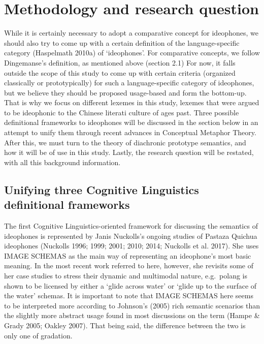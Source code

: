 \section{Methodology and research
question}\label{methodology-and-research-question}

While it is certainly necessary to adopt a comparative concept for
ideophones, we should also try to come up with a certain definition of
the language-specific category (Haspelmath 2010a) of `ideophones'. For
comparative concepts, we follow Dingemanse's definition, as mentioned
above (section 2.1) For now, it falls outside the scope of this study to
come up with certain criteria (organized classically or prototypically)
for such a language-specific category of ideophones, but we believe they
should be proposed usage-based and form the bottom-up. That is why we
focus on different lexemes in this study, lexemes that were argued to be
ideophonic to the Chinese literati culture of ages past. Three possible
definitional frameworks to ideophones will be discussed in the section
below in an attempt to unify them through recent advances in Conceptual
Metaphor Theory. After this, we must turn to the theory of diachronic
prototype semantics, and how it will be of use in this study. Lastly,
the research question will be restated, with all this background
information.

\subsection{Unifying three Cognitive Linguistics definitional
frameworks}\label{unifying-three-cognitive-linguistics-definitional-frameworks}

The first Cognitive Linguistics-oriented framework for discussing the
semantics of ideophones is represented by Janis Nuckolls's ongoing
studies of Pastaza Quichua ideophones (Nuckolls 1996; 1999; 2001; 2010;
2014; Nuckolls et al. 2017). She uses IMAGE SCHEMAS as the main way of
representing an ideophone's most basic meaning. In the most recent work
referred to here, however, she revisits some of her case studies to
stress their dynamic and multimodal nature, e.g.~polang is shown to be
licensed by either a `glide across water' or `glide up to the surface of
the water' schemas. It is important to note that IMAGE SCHEMAS here
seems to be interpreted more according to Johnson's (2005) rich semantic
scenarios than the slightly more abstract usage found in most
discussions on the term (Hampe \& Grady 2005; Oakley 2007). That being
said, the difference between the two is only one of gradation.

